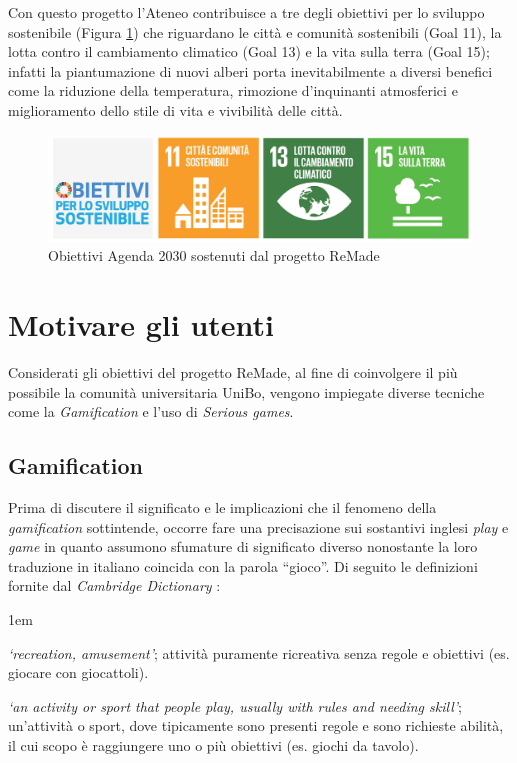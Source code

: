 Con questo progetto l'Ateneo contribuisce a tre degli obiettivi per lo sviluppo sostenibile (Figura \ref{fig:remade_dgs}) che riguardano le città e comunità sostenibili (Goal 11), la lotta contro il cambiamento climatico (Goal 13) e la vita sulla terra (Goal 15); infatti la piantumazione di nuovi alberi porta inevitabilmente a diversi benefici come la riduzione della temperatura, rimozione d'inquinanti atmosferici e miglioramento dello stile di vita e vivibilità delle città.
\begin{figure}
    \centering
    \includegraphics[width=\textwidth]{img/sdg_remade.png}
    \caption{Obiettivi Agenda 2030 sostenuti dal progetto ReMade}
    \label{fig:remade_dgs}
\end{figure}
\newpage
\section{Motivare gli utenti}
Considerati gli obiettivi del progetto ReMade, al fine di coinvolgere il più possibile la comunità universitaria UniBo, vengono impiegate diverse tecniche come la \textit{Gamification} e l'uso di \textit{Serious games}.
%
%
\subsection{Gamification}
\label{sec:gamification}
Prima di discutere il significato e le implicazioni che il fenomeno della \textit{gamification} sottintende, occorre fare una precisazione sui sostantivi inglesi \textit{play} e \textit{game} in quanto assumono sfumature di significato diverso nonostante la loro traduzione in italiano coincida con la parola \enquote{gioco}. Di seguito le definizioni fornite dal \textit{Cambridge Dictionary} \cite{cambridgeDict}:

\begin{description}
    \itemsep1em
    \item [\textit{Play}] \textit{ \enquote*{recreation, amusement}}; attività puramente ricreativa senza regole e obiettivi (es. giocare con giocattoli).
    \item [\textit{Game}] \textit{\enquote*{an activity or sport that people play, usually with rules and needing skill}}; un'attività o sport, dove tipicamente sono presenti regole e sono richieste abilità, il cui scopo è raggiungere uno o più obiettivi (es. giochi da tavolo).
\end{description}

